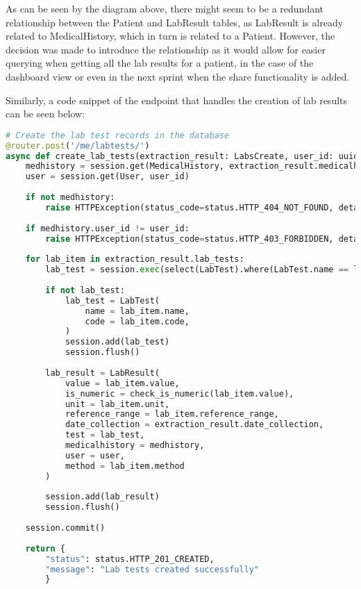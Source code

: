 \noindent\begin{minipage}{\textwidth}
  \begin{center}
      \label{fig:erd_s5}
  \end{center}
\end{minipage}

\FloatBarrier{}

As can be seen by the diagram above, there might seem to be a redundant relationship between the Patient and LabResult tables, as LabResult is already related to MedicalHistory, which in turn is related to a Patient. However, the decision was made to introduce the relationship as it would allow for easier querying when getting all the lab results for a patient, in the case of the dashboard view or even in the next sprint when the share functionality is added.

Similarly, a code snippet of the endpoint that handles the creation of lab results can be seen below:

\begin{lstlisting}[language=Python, caption=Lab Results Endpoint]
  # Create the lab test records in the database
@router.post('/me/labtests/')
async def create_lab_tests(extraction_result: LabsCreate, user_id: uuid.UUID = Depends(validate_session), session: Session = Depends(get_session)):
    medhistory = session.get(MedicalHistory, extraction_result.medicalhistory_id)
    user = session.get(User, user_id)
    
    if not medhistory:
        raise HTTPException(status_code=status.HTTP_404_NOT_FOUND, detail="Medical history not found")
    
    if medhistory.user_id != user_id:
        raise HTTPException(status_code=status.HTTP_403_FORBIDDEN, detail="Not authorized to access this medical history")
    
    for lab_item in extraction_result.lab_tests:
        lab_test = session.exec(select(LabTest).where(LabTest.name == lab_item.name)).first()
        
        if not lab_test:
            lab_test = LabTest(
                name = lab_item.name,
                code = lab_item.code,
            )
            session.add(lab_test)
            session.flush()
        
        lab_result = LabResult(
            value = lab_item.value,
            is_numeric = check_is_numeric(lab_item.value),
            unit = lab_item.unit,
            reference_range = lab_item.reference_range,
            date_collection = extraction_result.date_collection,
            test = lab_test,
            medicalhistory = medhistory,
            user = user,
            method = lab_item.method
        )
        
        session.add(lab_result)
        session.flush()
        
    session.commit()
    
    return {
        "status": status.HTTP_201_CREATED,
        "message": "Lab tests created successfully"
        }
\end{lstlisting}

